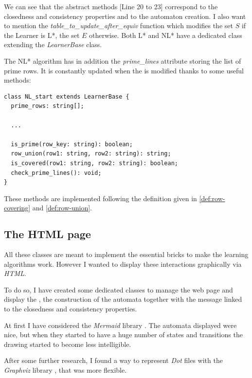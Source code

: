 We can see that the abstract methods [Line 20 to 23] correspond to the closedness and consistency properties and to the automaton creation. I also want to mention the \textit{table\_to\_update\_after\_equiv} function which modifies the set $S$ if the Learner is L*, the set $E$ otherwise. Both L* and NL* have a dedicated class extending the \textit{LearnerBase} class.

The NL* algorithm has in addition the \textit{prime\_lines} attribute storing the list of prime rows. It is constantly updated when the \OT is modified thanks to some useful methods:

\begin{verbatim}
class NL_start extends LearnerBase {
  prime_rows: string[];

  ... 

  is_prime(row_key: string): boolean;
  row_union(row1: string, row2: string): string;
  is_covered(row1: string, row2: string): boolean;
  check_prime_lines(): void;
}
\end{verbatim}

These methods are implemented following the definition given in \cref{def:row-covering} and \cref{def:row-union}.

\subsection{The HTML page}

All these classes are meant to implement the essential bricks to make the learning algorithms work. However I wanted to display these interactions graphically via \textit{HTML}.

To do so, I have created some dedicated classes to manage the web page and display the \OT, the construction of the automata together with the message linked to the closedness and consistency properties.

At first I have considered the \textit{Mermaid} library \cite{Mermaid}. The automata displayed were nice, but when they started to have a huge number of states and transitions the drawing started to become less intelligible.

After some further research, I found a way to represent \textit{Dot} files with the \textit{Graphviz} library \cite{Graphviz}, that was more flexible.


